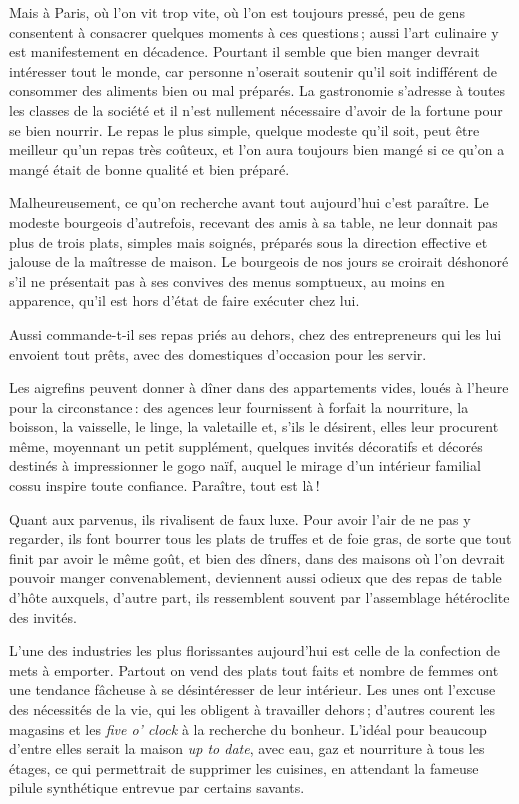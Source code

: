 Mais à Paris, où l'on vit trop vite, où l'on est toujours pressé, peu de gens
consentent à consacrer quelques moments à ces questions ; aussi l'art culinaire
y est manifestement en décadence. Pourtant il semble que bien manger devrait
intéresser tout le monde, car personne n'oserait soutenir qu'il soit
indifférent de consommer des aliments bien ou mal préparés. La gastronomie
s'adresse à toutes les classes de la société et il n'est nullement nécessaire
d'avoir de la fortune pour se bien nourrir. Le repas le plus simple, quelque
modeste qu'il soit, peut être meilleur qu'un repas très coûteux, et l’on aura
toujours bien mangé si ce qu'on a mangé était de bonne qualité et bien préparé.

Malheureusement, ce qu'on recherche avant tout aujourd'hui c'est paraître. Le
modeste bourgeois d'autrefois, recevant des amis à sa table, ne leur donnait
pas plus de trois plats, simples mais soignés, préparés sous la direction
effective et jalouse de la maîtresse de maison. Le bourgeois de nos jours se
croirait déshonoré s'il ne présentait pas à ses convives des menus somptueux,
au moins en apparence, qu'il est hors d'état de faire exécuter chez lui.

Aussi commande-t-il ses repas priés au dehors, chez des entrepreneurs qui les
lui envoient tout prêts, avec des domestiques d'occasion pour les servir.

Les aigrefins peuvent donner à dîner dans des appartements vides, loués
à l'heure pour la circonstance : des agences leur fournissent à forfait la
nourriture, la boisson, la vaisselle, le linge, la valetaille et, s'ils le
désirent, elles leur procurent même, moyennant un petit supplément, quelques
invités décoratifs et décorés destinés à impressionner le gogo naïf, auquel le
mirage d'un intérieur familial cossu inspire toute confiance. Paraître, tout
est là !

Quant aux parvenus, ils rivalisent de faux luxe. Pour avoir l'air de ne pas
y regarder, ils font bourrer tous les plats de truffes et de foie gras, de
sorte que tout finit par avoir le même goût, et bien des dîners, dans des
maisons où l'on devrait pouvoir manger convenablement, deviennent aussi odieux
que des repas de table d'hôte auxquels, d'autre part, ils ressemblent souvent
par l'assemblage hétéroclite des invités.

L'une des industries les plus florissantes aujourd'hui est celle de la
confection de mets à emporter. Partout on vend des plats tout faits et nombre
de femmes ont une tendance fâcheuse à se désintéresser de leur intérieur. Les
unes ont l'excuse des nécessités de la vie, qui les obligent à travailler
dehors ; d'autres courent les magasins et les \textit{five o' clock} à la
recherche du bonheur. L'idéal pour beaucoup d'entre elles serait la maison
\textit{up to date}, avec eau, gaz et nourriture à tous les étages, ce qui
permettrait de supprimer les cuisines, en attendant la fameuse pilule
synthétique entrevue par certains savants.

